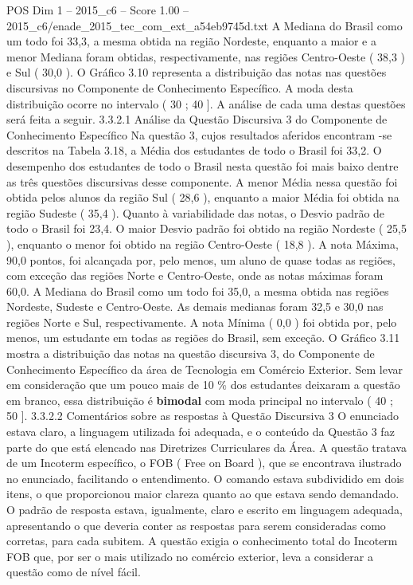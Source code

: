 \begin{textsample}{POS Dim 1 – 2015\_c6 – Score 1.00 – 2015\_c6/enade\_2015\_tec\_com\_ext\_a54eb9745d.txt}
A Mediana do Brasil como um todo foi 33,3, a mesma obtida na região Nordeste, enquanto a maior e a menor Mediana foram obtidas, respectivamente, nas regiões Centro-Oeste ( 38,3 ) e Sul ( 30,0 ).
O Gráfico 3.10 representa a distribuição das notas nas questões discursivas no Componente de Conhecimento Específico.
A moda desta distribuição ocorre no intervalo ( 30 ; 40 ].
A análise de cada uma destas questões será feita a seguir. 3.3.2.1 Análise da Questão Discursiva 3 do Componente de Conhecimento Específico Na questão 3, cujos resultados aferidos encontram -se descritos na Tabela 3.18, a Média dos estudantes de todo o Brasil foi 33,2.
O desempenho dos estudantes de todo o Brasil nesta questão foi mais baixo dentre as três questões discursivas desse componente.
A menor Média nessa questão foi obtida pelos alunos da região Sul ( 28,6 ), enquanto a maior Média foi obtida na região Sudeste ( 35,4 ).
Quanto à variabilidade das notas, o Desvio padrão de todo o Brasil foi 23,4.
O maior Desvio padrão foi obtido na região Nordeste ( 25,5 ), enquanto o menor foi obtido na região Centro-Oeste ( 18,8 ).
A nota Máxima, 90,0 pontos, foi alcançada por, pelo menos, um aluno de quase todas as regiões, com exceção das regiões Norte e Centro-Oeste, onde as notas máximas foram 60,0.
A Mediana do Brasil como um todo foi 35,0, a mesma obtida nas regiões Nordeste, Sudeste e Centro-Oeste.
As demais medianas foram 32,5 e 30,0 nas regiões Norte e Sul, respectivamente.
A nota Mínima ( 0,0 ) foi obtida por, pelo menos, um estudante em todas as regiões do Brasil, sem exceção.
O Gráfico 3.11 mostra a distribuição das notas na questão discursiva 3, do Componente de Conhecimento Específico da área de Tecnologia em Comércio Exterior.
Sem levar em consideração que um pouco mais de 10 \% dos estudantes deixaram a questão em branco, essa distribuição é \textbf{bimodal} com moda principal no intervalo ( 40 ; 50 ]. 3.3.2.2 Comentários sobre as respostas à Questão Discursiva 3 O enunciado estava claro, a linguagem utilizada foi adequada, e o conteúdo da Questão 3 faz parte do que está elencado nas Diretrizes Curriculares da Área.
A questão tratava de um Incoterm específico, o FOB ( Free on Board ), que se encontrava ilustrado no enunciado, facilitando o entendimento.
O comando estava subdividido em dois itens, o que proporcionou maior clareza quanto ao que estava sendo demandado.
O padrão de resposta estava, igualmente, claro e escrito em linguagem adequada, apresentando o que deveria conter as respostas para serem consideradas como corretas, para cada subitem.
A questão exigia o conhecimento total do Incoterm FOB que, por ser o mais utilizado no comércio exterior, leva a considerar a questão como de nível fácil.

\end{textsample}

